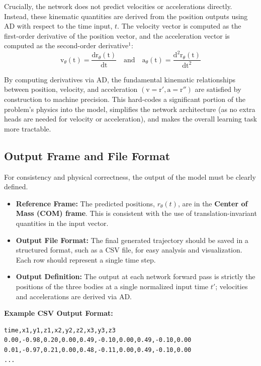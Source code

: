 Crucially, the network does not predict velocities or accelerations directly. Instead, these kinematic quantities are derived from the position outputs using AD with respect to the time input, $t$. The velocity vector is computed as the first-order derivative of the position vector, and the acceleration vector is computed as the second-order derivative$^1$:
\[
\mathrm{v}_\theta(\mathrm{t}) = \frac{\mathrm{d} \mathrm{r}_\theta(\mathrm{t})}{\mathrm{d} \mathrm{t}} \quad \text{and} \quad \mathrm{a}_\theta(\mathrm{t}) = \frac{\mathrm{d}^2 \mathrm{r}_\theta(\mathrm{t})}{\mathrm{d} \mathrm{t}^2}
\]

By computing derivatives via AD, the fundamental kinematic relationships between position, velocity, and acceleration $(\mathrm{v} = \mathrm{r}', \mathrm{a} = \mathrm{r}'')$ are satisfied by construction to machine precision. This hard-codes a significant portion of the problem's physics into the model, simplifies the network architecture (as no extra heads are needed for velocity or acceleration), and makes the overall learning task more tractable.





\subsection{Output Frame and File Format}
For consistency and physical correctness, the output of the model must be clearly defined.
\begin{itemize}
    \item \textbf{Reference Frame:} The predicted positions, $r_{\theta}(t)$, are in the \textbf{Center of Mass (COM) frame}. This is consistent with the use of translation-invariant quantities in the input vector.
    \item \textbf{Output File Format:} The final generated trajectory should be saved in a structured format, such as a CSV file, for easy analysis and visualization. Each row should represent a single time step.
    \item \textbf{Output Definition:} The output at each network forward pass is strictly the positions of the three bodies at a single normalized input time $t'$;
    velocities and accelerations are derived via AD.
\end{itemize}

\textbf{Example CSV Output Format:}
\begin{verbatim}
time,x1,y1,z1,x2,y2,z2,x3,y3,z3
0.00,-0.98,0.20,0.00,0.49,-0.10,0.00,0.49,-0.10,0.00
0.01,-0.97,0.21,0.00,0.48,-0.11,0.00,0.49,-0.10,0.00
...
\end{verbatim}
